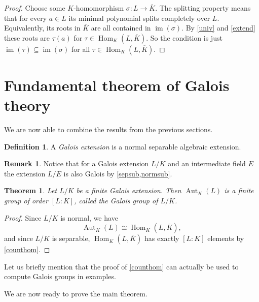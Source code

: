 \documentclass[11pt,reqno]{amsart}
\theoremstyle{standard}
\newtheorem{thm}[lemma]{Theorem}
\theoremstyle{definition}
\newtheorem{defi}[lemma]{Definition}
\newtheorem{rem}[lemma]{Remark}
\DeclareMathOperator{\Hom}{Hom}
\DeclareMathOperator{\Aut}{Aut}
\DeclareMathOperator{\im}{im}
\newcommand{\alg}[1]{\overline{#1}}
\begin{document}
\begin{proof}
Choose some $K$-homomorphism $\sigma : L \to \alg{K}$. The splitting property means that for every $a \in L$ its minimal polynomial splits completely over $L$. Equivalently, its roots in $\alg{K}$ are all contained in $\im(\sigma)$. By \cref{univ} and \cref{extend} these roots are $\tau(a)$ for $\tau \in \Hom_K(L,\alg{K})$. So the condition is just $\im(\tau) \subseteq \im(\sigma)$ for all $\tau \in \Hom_K(L,\alg{K})$.
\end{proof}



\section{Fundamental theorem of Galois theory}

We are now able to combine the results from the previous sections.

\begin{defi}
A \emph{Galois extension} is a normal separable algebraic extension.
\end{defi}

\begin{rem} \label{galoissup}
Notice that for a Galois extension $L/K$ and an intermediate field $E$ the extension $L/E$ is also Galois by \cref{sepsub,normsub}.
\end{rem}

\begin{thm}\label{order}
Let $L/K$ be a finite Galois extension. Then $\Aut_K(L)$ is a finite group of order $[L:K]$, called the \emph{Galois group} of $L/K$.
\end{thm}

\begin{proof}
Since $L/K$ is normal, we have
\[\Aut_K(L) \cong \Hom_K(L,\alg{K}),\]
and since $L/K$ is separable, $\Hom_K(L,\alg{K})$ has exactly $[L:K]$ elements by \cref{counthom}.
\end{proof}

Let us briefly mention that the proof of \cref{counthom} can actually be used to compute Galois groups in examples.

We are now ready to prove the main theorem.
\end{document}
